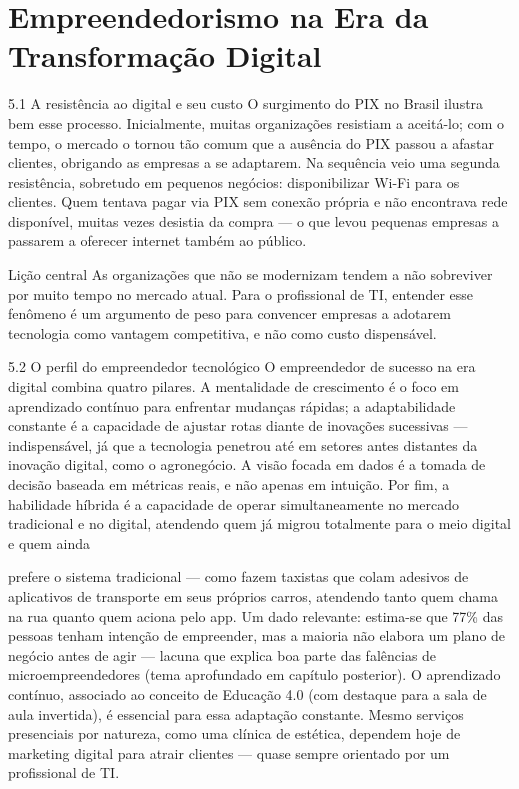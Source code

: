 \chapter{Empreendedorismo na Era da Transformação Digital}

5.1 A resistência ao digital e seu custo O surgimento do PIX no Brasil ilustra bem esse processo. Inicialmente, muitas organizações resistiam a aceitá-lo; com o tempo, o mercado o tornou tão comum que a ausência do PIX passou a afastar clientes, obrigando as empresas a se adaptarem. Na sequência veio uma segunda resistência, sobretudo em pequenos negócios: disponibilizar Wi-Fi para os clientes. Quem tentava pagar via PIX sem conexão própria e não encontrava rede disponível, muitas vezes desistia da compra — o que levou pequenas empresas a passarem a oferecer internet também ao público.

Lição central As organizações que não se modernizam tendem a não sobreviver por muito tempo no mercado atual. Para o profissional de TI, entender esse fenômeno é um argumento de peso para convencer empresas a adotarem tecnologia como vantagem competitiva, e não como custo dispensável.

5.2 O perfil do empreendedor tecnológico O empreendedor de sucesso na era digital combina quatro pilares. A mentalidade de crescimento é o foco em aprendizado contínuo para enfrentar mudanças rápidas; a adaptabilidade constante é a capacidade de ajustar rotas diante de inovações sucessivas — indispensável, já que a tecnologia penetrou até em setores antes distantes da inovação digital, como o agronegócio. A visão focada em dados é a tomada de decisão baseada em métricas reais, e não apenas em intuição. Por fim, a habilidade híbrida é a capacidade de operar simultaneamente no mercado tradicional e no digital, atendendo quem já migrou totalmente para o meio digital e quem ainda

prefere o sistema tradicional — como fazem taxistas que colam adesivos de aplicativos de transporte em seus próprios carros, atendendo tanto quem chama na rua quanto quem aciona pelo app. Um dado relevante: estima-se que 77\% das pessoas tenham intenção de empreender, mas a maioria não elabora um plano de negócio antes de agir — lacuna que explica boa parte das falências de microempreendedores (tema aprofundado em capítulo posterior). O aprendizado contínuo, associado ao conceito de Educação 4.0 (com destaque para a sala de aula invertida), é essencial para essa adaptação constante. Mesmo serviços presenciais por natureza, como uma clínica de estética, dependem hoje de marketing digital para atrair clientes — quase sempre orientado por um profissional de TI.

